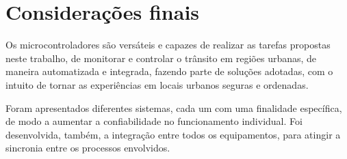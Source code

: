 \chapter{Considerações finais}

Os microcontroladores são versáteis e capazes de realizar as tarefas propostas neste trabalho, de monitorar e controlar o trânsito em regiões urbanas, de maneira automatizada e integrada, fazendo parte de soluções adotadas, com o intuito de tornar as experiências em locais urbanos seguras e ordenadas.

Foram apresentados diferentes sistemas, cada um com uma finalidade específica, de modo a aumentar a confiabilidade no funcionamento individual. Foi desenvolvida, também, a integração entre todos os equipamentos, para atingir a sincronia entre os processos envolvidos.

